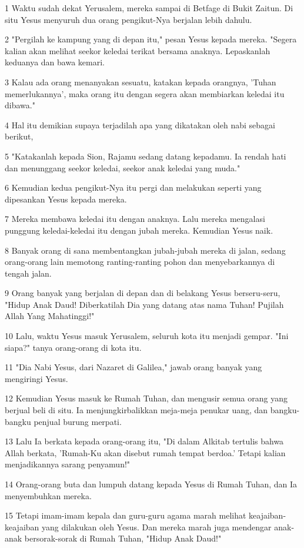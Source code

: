 \par 1 Waktu sudah dekat Yerusalem, mereka sampai di Betfage di Bukit Zaitun. Di situ Yesus menyuruh dua orang pengikut-Nya berjalan lebih dahulu.
\par 2 "Pergilah ke kampung yang di depan itu," pesan Yesus kepada mereka. "Segera kalian akan melihat seekor keledai terikat bersama anaknya. Lepaskanlah keduanya dan bawa kemari.
\par 3 Kalau ada orang menanyakan sesuatu, katakan kepada orangnya, 'Tuhan memerlukannya', maka orang itu dengan segera akan membiarkan keledai itu dibawa."
\par 4 Hal itu demikian supaya terjadilah apa yang dikatakan oleh nabi sebagai berikut,
\par 5 "Katakanlah kepada Sion, Rajamu sedang datang kepadamu. Ia rendah hati dan menunggang seekor keledai, seekor anak keledai yang muda."
\par 6 Kemudian kedua pengikut-Nya itu pergi dan melakukan seperti yang dipesankan Yesus kepada mereka.
\par 7 Mereka membawa keledai itu dengan anaknya. Lalu mereka mengalasi punggung keledai-keledai itu dengan jubah mereka. Kemudian Yesus naik.
\par 8 Banyak orang di sana membentangkan jubah-jubah mereka di jalan, sedang orang-orang lain memotong ranting-ranting pohon dan menyebarkannya di tengah jalan.
\par 9 Orang banyak yang berjalan di depan dan di belakang Yesus berseru-seru, "Hidup Anak Daud! Diberkatilah Dia yang datang atas nama Tuhan! Pujilah Allah Yang Mahatinggi!"
\par 10 Lalu, waktu Yesus masuk Yerusalem, seluruh kota itu menjadi gempar. "Ini siapa?" tanya orang-orang di kota itu.
\par 11 "Dia Nabi Yesus, dari Nazaret di Galilea," jawab orang banyak yang mengiringi Yesus.
\par 12 Kemudian Yesus masuk ke Rumah Tuhan, dan mengusir semua orang yang berjual beli di situ. Ia menjungkirbalikkan meja-meja penukar uang, dan bangku-bangku penjual burung merpati.
\par 13 Lalu Ia berkata kepada orang-orang itu, "Di dalam Alkitab tertulis bahwa Allah berkata, 'Rumah-Ku akan disebut rumah tempat berdoa.' Tetapi kalian menjadikannya sarang penyamun!"
\par 14 Orang-orang buta dan lumpuh datang kepada Yesus di Rumah Tuhan, dan Ia menyembuhkan mereka.
\par 15 Tetapi imam-imam kepala dan guru-guru agama marah melihat keajaiban-keajaiban yang dilakukan oleh Yesus. Dan mereka marah juga mendengar anak-anak bersorak-sorak di Rumah Tuhan, "Hidup Anak Daud!"
